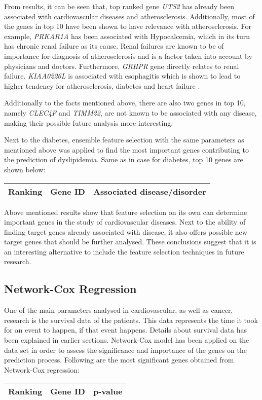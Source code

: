 \documentclass{ba-kecs}
\numberwithin{figure}{section}
\numberwithin{equation}{section}
\begin{document}
From results, it can be seen that, top ranked gene \textit{UTS2} has already been associated with cardiovascular diseases and atherosclerosis. Additionally, most of the genes in top 10 have been shown to have relevance with atherosclerosis. For example,
\textit{PRKAR1A} has been associated with Hypocalcemia, which in its turn has chronic renal failure as its cause. Renal failures are known to be of importance for diagnosis of atherosclerosis and is a factor taken into account by physicians and doctors. Furthermore, \textit{GRHPR} gene directly relates to renal failure. \textit{KIAA0226L} is associated with esophagitis which is shown to lead to higher tendency for atherosclerosis, diabetes and heart failure \cite{esophagitis}.

Additionally to the facts mentioned above, there are also two genes in top 10, namely \textit{CLEC4F} and \textit{TIMM22}, are not known to be associated with any disease, making their possible future analysis more interesting.

Next to the diabetes, ensemble feature selection with the same parameters as mentioned above was applied to find the most important genes contributing to the prediction of dyslipidemia. Same as in case for diabetes, top 10 genes are shown below:
\begin{center}
\begin{tabular}{|l|l|l|}
\hline
Ranking & Gene ID & Associated disease/disorder \\ \hline

\end{tabular}
\end{center}

Above mentioned results show that feature selection on its own can determine important genes in the study of cardiovascular diseases. Next to the ability of finding target genes already associated with disease, it also offers possible new target genes that should be further analysed. These conclusions suggest that it is an interesting alternative to include the feature selection techniques in future research.

\subsection{Network-Cox Regression}

One of the main parameters analysed in cardiovascular, as well as cancer, research is the survival data of the patients. This data represents the time it took for an event to happen, if that event happens. Details about survival data has been explained in earlier sections. Network-Cox model has been applied on the data set in order to assess the significance and importance of the genes on the prediction process. Following are the most significant genes obtained from Network-Cox regression:
\begin{center}
\begin{tabular}{|l|l|l|}
\hline
Ranking & Gene ID & p-value \\ \hline

\end{tabular}
\end{center}
\end{document}
